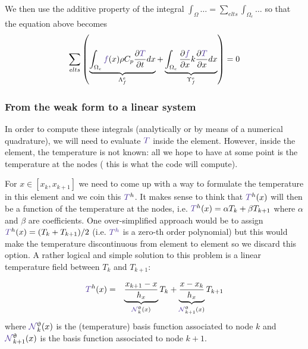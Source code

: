We then use the additive property of the integral 
$\int_\Omega \dots = \sum\limits_{elts} \int_{\Omega_e} \dots$
so that the equation above becomes 
\begin{equation}
\sum_{elts} \left(     
\underbrace{ \int_{\Omega_e} {\color{Violet}f}(x) \rho C_p   \frac{\partial {\color{Violet}T}}{\partial t} dx }_{{\Lambda}_f^e}
+
\underbrace{\int_{\Omega_e} \frac{\partial {\color{Violet}f}}{\partial x}  k \frac{\partial {\color{Violet}T}}{\partial x}  dx}_{{\Upsilon}_f^e}      \right) = 0  
\end{equation}


\subsubsection{From the weak form to a linear system}

In order to compute these integrals (analytically or by means of a numerical quadrature), 
we will need to evaluate ${\color{Violet}T}$ inside the element. However, inside the element, 
the temperature is not known: all we hope to have at some point is the temperature at the nodes (
this is what the code will compute). 

For $x\in [x_k,x_{k+1}]$ we need to come up with a way to formulate the temperature in this element and 
we coin this ${\color{Violet}T}^h$.  
It makes sense to think that ${\color{Violet}T}^h(x)$ will then be a function of the temperature at the nodes, 
i.e. ${\color{Violet}T}^h(x) = \alpha T_k + \beta T_{k+1}$ where $\alpha$ and $\beta$ are coefficients. 
One over-simplified approach would be to assign ${\color{Violet}T}^h(x)=(T_k + T_{k+1})/2$ 
(i.e. ${\color{Violet}T^h}$ is a zero-th order polynomial) but this would make the
temperature discontinuous from element to element so we discard this option. 
A rather logical and simple solution to this problem is a linear temperature field between $T_k$
and $T_{k+1}$: 

\begin{eqnarray}
{\color{Violet}T}^h(x) 
&=& \underbrace{\frac{x_{k+1}-x}{h_x}}_{{\color{Violet}\bN}_k^\uptheta(x)} T_k 
+ 
\underbrace{\frac{x-x_k}{h_x}}_{{\color{Violet}\bN}_{k+1}^\uptheta(x)} T_{k+1} \nn
\end{eqnarray}
where ${\color{Violet}\bN}_k^\uptheta(x)$ is the (temperature) basis function associated to node $k$ and 
${\color{Violet}\bN}_{k+1}^\uptheta(x)$ is the basis function associated to node $k+1$.

